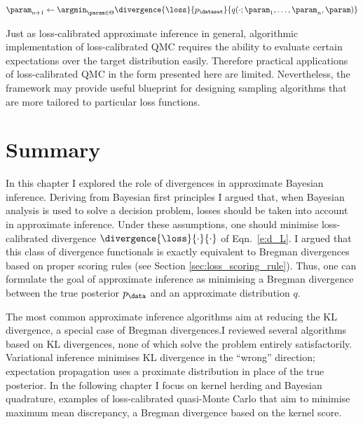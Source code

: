 \begin{equation}
	\param_{n+1} \leftarrow \argmin_{\param \in \Theta} \divergence{\loss}{p_\dataset}{q(\cdot ; \param_1,\ldots,\param_{n},\param)} \label{eqn:loss_calibrated_sequential}
\end{equation}

Just as loss-calibrated approximate inference in general, algorithmic implementation of loss-calibrated QMC requires the ability to evaluate certain expectations over the target distribution easily. Therefore practical applications of loss-calibrated QMC in the form presented here are limited. Nevertheless, the framework may provide useful blueprint for designing sampling algorithms that are more tailored to particular loss functions.

\section{Summary}

In this chapter I explored the role of divergences in approximate Bayesian inference. Deriving from Bayesian first principles I argued that, when Bayesian analysis is used to solve a decision problem, losses should be taken into account in approximate inference. Under these assumptions, one should minimise loss-calibrated divergence $\divergence{\loss}{\cdot}{\cdot}$ of Eqn.\ \eqref{e:d_L}. I argued that this class of divergence functionals is exactly equivalent to Bregman divergences based on proper scoring rules (see Section \ref{sec:loss_scoring_rule}). Thus, one can formulate the goal of approximate inference as minimising a Bregman divergence between the true posterior $p_{\data}$ and an approximate distribution $q$.

The most common approximate inference algorithms aim at reducing the KL divergence, a special case of Bregman divergences.I reviewed several algorithms based on KL divergences, none of which solve the problem entirely satisfactorily. Variational inference minimises KL divergence in the ``wrong'' direction; expectation propagation uses a proximate distribution in place of the true posterior. In the following chapter I focus on kernel herding and Bayesian quadrature, examples of loss-calibrated quasi-Monte Carlo that aim to minimise maximum mean discrepancy, a Bregman divergence based on the kernel score.